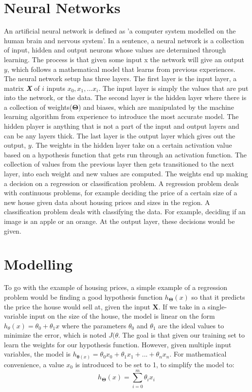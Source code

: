 \documentclass[a4paper,12pt]{article}
\begin{document}
\section{Neural Networks}
An artificial neural network is defined as 'a computer system modelled on the human brain and nervous system'. In a sentence, a neural network is a collection of input, hidden and output neurons whose values are determined through learning. The process is that given some input x the network will give an output \(y\), which follows a mathematical model that learns from previous experiences. The neural network setup has three layers. The first layer is the input layer, a matrix \textbf{\emph{X}} of \(i\) inputs \(x_0,x_1,...x_i\). The input layer is simply the values that are put into the network, or the data. The second layer is the hidden layer where there is a collection of weights(\(\boldsymbol{\Theta}\)) and biases, which are manipulated by the machine learning algorithm from experience to introduce the most accurate model. The hidden player is anything that is not a part of the input and output layers and can be any layers thick. The last layer is the output layer which gives out the output, \(y\). The weights in the hidden layer take on a certain activation value based on a hypothesis function that gets run through an activation function. The collection of values from the previous layer then gets transitioned to the next layer, into each weight and new values are computed. The weights end up making a decision on a regression or classification problem. A regression problem deals with continuous problems, for example deciding the price of a certain size of a new house given data about housing prices and sizes in the region. A classification problem deals with classifying the data. For example, deciding if an image is an apple or an orange. At the output layer, these decisions would be given.

\section{Modelling}
To go with the example of housing prices, a simple example of a regression problem would be finding a good hypothesis function \(h_{\boldsymbol{\Theta}}(x)\) so that it predicts the price the house would sell at, given the input $\boldsymbol{X}$. If we take in a single-variable input on the size of the house, the model is linear on the form  \(h_\theta(x) = \theta_0 + \theta_1x\) where the parameters \(\theta_0\) and \(\theta_1\) are the ideal values to minimize the error, which is noted \(J(\theta\). The goal is that given our training set to learn the weights for our hypothesis function. However, given multiple input variables, the model is \(h_{\boldsymbol{\theta}(x)} = \theta_0x_0 + \theta_1x_1 + ... + \theta_nx_n\). For mathematical convenience, a value $x_0$ is introduced to be set to 1, to simplify the model to:
\[h_{\boldsymbol{\Theta}}(x) = \sum_{i = 0}^m \theta_ix_i\]
\end{document}
